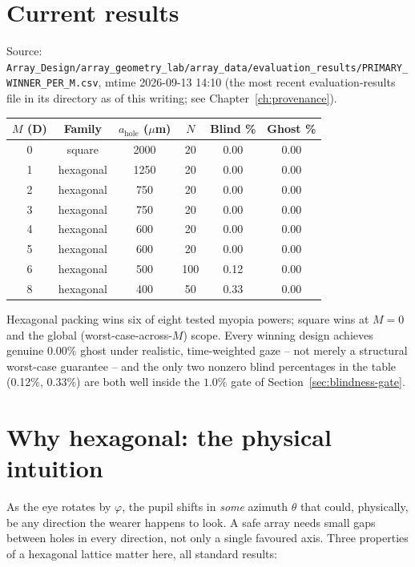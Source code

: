 \section{Current results}
\label{sec:model-b-results}
Source: \texttt{Array\_Design/array\_geometry\_lab/array\_data/evaluation\_results/PRIMARY\_WINNER\_PER\_M.csv},
mtime 2026-09-13 14:10 (the most recent evaluation-results file in its directory as of
this writing; see Chapter~\ref{ch:provenance}).
\begin{center}
\begin{tabular}{cccccc}
\toprule
$M$ (D) & Family & $a_{\mathrm{hole}}$ ($\mu$m) & $N$ & Blind \% & Ghost \% \\
\midrule
0 & square & 2000 & 20 & 0.00 & 0.00 \\
1 & hexagonal & 1250 & 20 & 0.00 & 0.00 \\
2 & hexagonal & 750 & 20 & 0.00 & 0.00 \\
3 & hexagonal & 750 & 20 & 0.00 & 0.00 \\
4 & hexagonal & 600 & 20 & 0.00 & 0.00 \\
5 & hexagonal & 600 & 20 & 0.00 & 0.00 \\
6 & hexagonal & 500 & 100 & 0.12 & 0.00 \\
8 & hexagonal & 400 & 50 & 0.33 & 0.00 \\
\bottomrule
\end{tabular}
\end{center}
Hexagonal packing wins six of eight tested myopia powers; square wins at $M=0$ and the
global (worst-case-across-$M$) scope. Every winning design achieves genuine $0.00\%$
ghost under realistic, time-weighted gaze -- not merely a structural worst-case
guarantee -- and the only two nonzero blind percentages in the table (0.12\%, 0.33\%)
are both well inside the $1.0\%$ gate of Section~\ref{sec:blindness-gate}.

\section{Why hexagonal: the physical intuition}
\label{sec:hex-intuition}
As the eye rotates by $\varphi$, the pupil shifts in \emph{some} azimuth $\theta$ that
could, physically, be any direction the wearer happens to look. A safe array needs small
gaps between holes in every direction, not only a single favoured axis. Three properties
of a hexagonal lattice matter here, all standard results:

